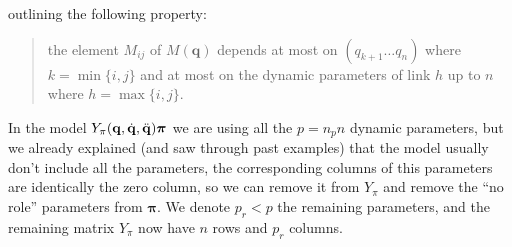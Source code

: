 \documentclass[10pt, a4paper]{report}
\newcommand{\q}{{\mathbf q}}
\begin{document}
outlining the following property:\begin{quote}
    the element $M_{ij}$ of $M(\q)$ depends at most on $(q_{k+1}\dots q_n)$ where $k=\min\{i,j\}$ and at most on the dynamic parameters of link $h$ up to $n$ where $h=\max\{i,j\}$.
\end{quote}
In the model $Y_\pi(\q,\dq,\ddq)\boldsymbol{\pi}$ we are using all the $p=n_pn$ dynamic parameters, but we already explained (and saw through past examples) that the model usually don't include all the parameters, the corresponding columns of this parameters are identically the zero column, so we can remove it from $Y_\pi$ and remove the ``no role'' parameters from $\boldsymbol{\pi}$. We denote $p_r<p$ the remaining parameters, and the remaining matrix $Y_{\pi}$ now have $n$ rows and $p_r$ columns. 
\end{document}
